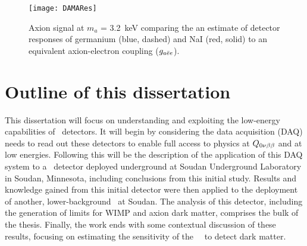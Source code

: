 		\begin{figure}
			\centering
			\texttt{[image: DAMARes]}
			\caption[Axion signal at $m_{a}$ = 3.2~keV]{Axion signal at $m_{a}$ = 3.2~keV comparing 
			the an estimate of detector responses of germanium (blue, dashed) and NaI (red, solid) to an equivalent
			axion-electron coupling ($g_{a\bar{e}e}$).}
			\label{fig:ResCompare}
		\end{figure}
	
	\section{Outline of this dissertation}


	This dissertation will focus on understanding and exploiting the low-energy capabilities of \ppc~detectors.  It will begin by considering the data acquisition (DAQ) needs to read out these detectors to enable full access to physics at $Q_{0 \nu \beta \beta}$ and at low energies.  Following this will be the description of the application of this DAQ system to a \ppc~detector deployed underground at Soudan Underground Laboratory in Soudan, Minnesota, including conclusions from this initial study.  Results and knowledge gained from this initial detector were then applied to the deployment of another, lower-background \ppc~at Soudan.  The analysis of this detector, including the generation of limits for WIMP and axion dark matter, comprises the bulk of the thesis.  Finally, the work ends with some contextual discussion of these results, focusing on estimating the sensitivity of the \MJ~\minmod~to detect dark matter.
